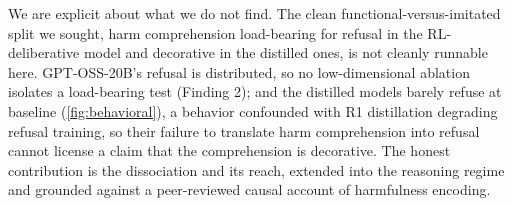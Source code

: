 We are explicit about what we do not find. The clean functional-versus-imitated
split we sought, harm comprehension load-bearing for refusal in the RL-deliberative
model and decorative in the distilled ones, is not cleanly runnable here.
GPT-OSS-20B's refusal is distributed, so no low-dimensional ablation isolates a
load-bearing test (Finding 2); and the distilled models barely refuse at baseline
(\autoref{fig:behavioral}), a behavior confounded with R1 distillation degrading
refusal training, so their failure to translate harm comprehension into refusal
cannot license a claim that the comprehension is decorative. The honest contribution
is the dissociation and its reach, extended into the reasoning regime and grounded
against a peer-reviewed causal account of harmfulness encoding.
